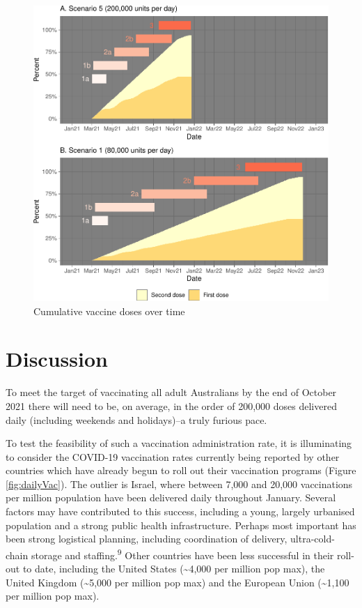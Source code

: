 \documentclass{article}
\begin{document}
\begin{figure}

{\centering \includegraphics{researchNote_files/figure-latex/cumlResults-1} 

}

\caption{Cumulative vaccine doses over time}\label{fig:cumlResults}
\end{figure}

\hypertarget{discussion}{%
\section{Discussion}\label{discussion}}

To meet the target of vaccinating all adult Australians by the end of
October 2021 there will need to be, on average, in the order of 200,000
doses delivered daily (including weekends and holidays)--a truly furious
pace.

To test the feasibility of such a vaccination administration rate, it is
illuminating to consider the COVID-19 vaccination rates currently being
reported by other countries which have already begun to roll out their
vaccination programs (Figure \ref{fig:dailyVac}). The outlier is Israel,
where between 7,000 and 20,000 vaccinations per million population have
been delivered daily throughout January. Several factors may have
contributed to this success, including a young, largely urbanised
population and a strong public health infrastructure. Perhaps most
important has been strong logistical planning, including coordination of
delivery, ultra-cold-chain storage and staffing.\textsuperscript{9}
Other countries have been less successful in their roll-out to date,
including the United States (\textasciitilde4,000 per million pop max),
the United Kingdom (\textasciitilde5,000 per million pop max) and the
European Union (\textasciitilde1,100 per million pop max).
\end{document}

